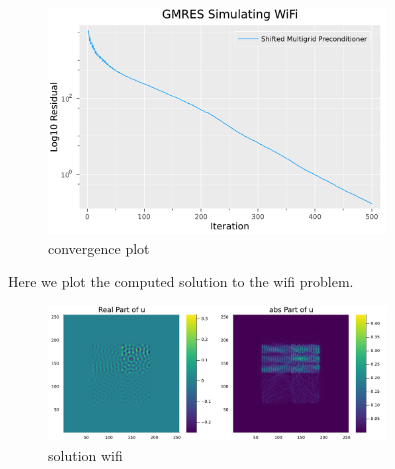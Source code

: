 \documentclass[a4paper,12pt]{article}
\begin{document}
\begin{figure}[h!]
    \centering
    \includegraphics[width=0.8\textwidth]{../plots/gmres_wifi.pdf}
    \caption{convergence plot}
    \label{fig:../plots/gmres_wifi.pdf}
\end{figure}

Here we plot the computed solution to the wifi problem.

\begin{figure}[h!]
    \centering
    \includegraphics[width=0.8\textwidth]{../plots/gmres_wifi_solution.pdf}
    \caption{solution wifi}
    \label{fig:../plots/gmres_wifi_solution.pdf}
\end{figure}
\end{document}
